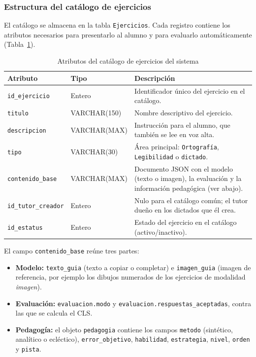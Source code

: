 \subsubsection{Estructura del catálogo de ejercicios}

El catálogo se almacena en la tabla \texttt{Ejercicios}. Cada registro contiene
los atributos necesarios para presentarlo al alumno y para evaluarlo
automáticamente (Tabla~\ref{tab:catalogo-ejercicios}).

\begin{table}[H]
\centering
\caption{Atributos del catálogo de ejercicios del sistema}
\label{tab:catalogo-ejercicios}
\begin{tabular}{|l|l|p{7cm}|}
\hline
\textbf{Atributo} & \textbf{Tipo} & \textbf{Descripción} \\
\hline
\texttt{id\_ejercicio}  & Entero        & Identificador único del ejercicio en el catálogo. \\
\texttt{titulo}         & VARCHAR(150)  & Nombre descriptivo del ejercicio. \\
\texttt{descripcion}    & VARCHAR(MAX)  & Instrucción para el alumno, que también se lee en voz alta. \\
\texttt{tipo}           & VARCHAR(30)   & Área principal: \texttt{Ortografía}, \texttt{Legibilidad} o \texttt{dictado}. \\
\texttt{contenido\_base}& VARCHAR(MAX)  & Documento JSON con el modelo (texto o imagen), la evaluación y la información pedagógica (ver abajo). \\
\texttt{id\_tutor\_creador} & Entero    & Nulo para el catálogo común; el tutor dueño en los dictados que él crea. \\
\texttt{id\_estatus}    & Entero        & Estado del ejercicio en el catálogo (activo/inactivo). \\
\hline
\end{tabular}
\end{table}

El campo \texttt{contenido\_base} reúne tres partes:

\begin{itemize}
    \item \textbf{Modelo:} \texttt{texto\_guia} (texto a copiar o completar) e
    \texttt{imagen\_guia} (imagen de referencia, por ejemplo los dibujos
    numerados de los ejercicios de modalidad \textit{imagen}).
    \item \textbf{Evaluación:} \texttt{evaluacion.modo} y
    \texttt{evaluacion.respuestas\_aceptadas}, contra las que se calcula el
    CLS.
    \item \textbf{Pedagogía:} el objeto \texttt{pedagogia} contiene los campos
    \texttt{metodo} (sintético, analítico o ecléctico),
    \texttt{error\_objetivo}, \texttt{habilidad}, \texttt{estrategia},
    \texttt{nivel}, \texttt{orden} y \texttt{pista}.
\end{itemize}

